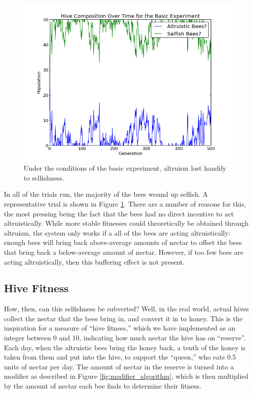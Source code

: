 \documentclass[11pt]{article}
\begin{document}
			\begin{figure}[tb]
				\begin{center}
					\includegraphics[scale=.75]{results/basic_comp.png}
				\end{center}
				\caption{Under the conditions of the basic experiment, altruism lost handily to selfishness.}
				\label{fig:basic_experiment_composition}
			\end{figure}

			In all of the trials run, the majority of the bees wound up selfish. A representative trial is shown in Figure \ref{fig:basic_experiment_composition}. There are a number of reasons for this, the most pressing being the fact that the bees had no direct incentive to act altruistically. While more stable fitnesses could theoretically be obtained through altruism, the system only works if a all of the bees are acting altruistically: enough bees will bring back above-average amounts of nectar to offset the bees that bring back a below-average amount of nectar. However, if too few bees are acting altruistically, then this buffering effect is not present. 



		\subsection{Hive Fitness} %
		\label{sub:hive_fitness}
			How, then, can this selfishness be subverted? Well, in the real world, actual hives collect the nectar that the bees bring in, and convert it in to honey. This is the inspiration for a measure of ``hive fitness,'' which we have implemented as an integer between 0 and 10, indicating how much nectar the hive has on ``reserve''. Each day, when the altruistic bees bring the honey back, a tenth of the honey is taken from them and put into the hive, to support the ``queen,'' who eats 0.5 units of nectar per day. The amount of nectar in the reserve is turned into a modifier as described in Figure \ref{fig:modifier_algorithm}, which is then multiplied by the amount of nectar each bee finds to determine their fitness.
\end{document}
